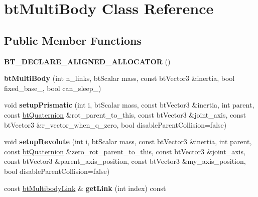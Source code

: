 \hypertarget{classbt_multi_body}{\section{bt\+Multi\+Body Class Reference}
\label{classbt_multi_body}
}
\subsection*{Public Member Functions}
\begin{DoxyCompactItemize}
\item 
\hypertarget{classbt_multi_body_a607c1ece0fdf16a6d32ac8eafd91976e}{{\bfseries B\+T\+\_\+\+D\+E\+C\+L\+A\+R\+E\+\_\+\+A\+L\+I\+G\+N\+E\+D\+\_\+\+A\+L\+L\+O\+C\+A\+T\+O\+R} ()}\label{classbt_multi_body_a607c1ece0fdf16a6d32ac8eafd91976e}

\item 
\hypertarget{classbt_multi_body_ab221797839166ac108b3878c3a823768}{{\bfseries bt\+Multi\+Body} (int n\+\_\+links, bt\+Scalar mass, const bt\+Vector3 \&inertia, bool fixed\+\_\+base\+\_\+, bool can\+\_\+sleep\+\_\+)}\label{classbt_multi_body_ab221797839166ac108b3878c3a823768}

\item 
\hypertarget{classbt_multi_body_ad9921754c20a1de7fbc4dfe82e3ccba2}{void {\bfseries setup\+Prismatic} (int i, bt\+Scalar mass, const bt\+Vector3 \&inertia, int parent, const \hyperlink{classbt_quaternion}{bt\+Quaternion} \&rot\+\_\+parent\+\_\+to\+\_\+this, const bt\+Vector3 \&joint\+\_\+axis, const bt\+Vector3 \&r\+\_\+vector\+\_\+when\+\_\+q\+\_\+zero, bool disable\+Parent\+Collision=false)}\label{classbt_multi_body_ad9921754c20a1de7fbc4dfe82e3ccba2}

\item 
\hypertarget{classbt_multi_body_a90726123e71ab232653365aa4ef3d18b}{void {\bfseries setup\+Revolute} (int i, bt\+Scalar mass, const bt\+Vector3 \&inertia, int parent, const \hyperlink{classbt_quaternion}{bt\+Quaternion} \&zero\+\_\+rot\+\_\+parent\+\_\+to\+\_\+this, const bt\+Vector3 \&joint\+\_\+axis, const bt\+Vector3 \&parent\+\_\+axis\+\_\+position, const bt\+Vector3 \&my\+\_\+axis\+\_\+position, bool disable\+Parent\+Collision=false)}\label{classbt_multi_body_a90726123e71ab232653365aa4ef3d18b}

\item 
\hypertarget{classbt_multi_body_a781e21f93b6790d1657d7d3cdb8022d0}{const \hyperlink{structbt_multibody_link}{bt\+Multibody\+Link} \& {\bfseries get\+Link} (int index) const }\label{classbt_multi_body_a781e21f93b6790d1657d7d3cdb8022d0}


\end{DoxyCompactItemize}
